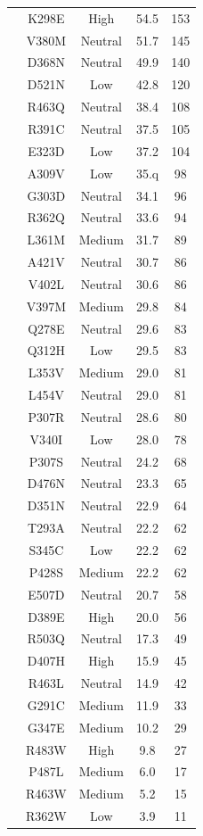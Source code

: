 \documentclass[9pt,lineno]{elife}
\begin{document}
\begin{table}[h!]
\begin{threeparttable}
\begin{tabular}{ccccc}
 &K298E & High & 54.5 & 153 \\
 &V380M & Neutral & 51.7 & 145 \\
 &D368N & Neutral & 49.9 & 140 \\
 &D521N & Low & 42.8 & 120 \\
 &R463Q & Neutral & 38.4 & 108 \\
 &R391C & Neutral & 37.5 & 105 \\
 &E323D & Low & 37.2 & 104 \\
 &A309V & Low & 35.q & 98 \\
 &G303D & Neutral & 34.1 & 96 \\
 &R362Q & Neutral & 33.6 & 94 \\
 &L361M & Medium & 31.7 & 89 \\
 &A421V & Neutral & 30.7 & 86 \\
 &V402L & Neutral & 30.6 & 86 \\
 &V397M & Medium & 29.8 & 84 \\
 &Q278E & Neutral & 29.6 & 83 \\
 &Q312H & Low & 29.5& 83 \\
 &L353V & Medium & 29.0 & 81 \\
 &L454V & Neutral & 29.0 & 81 \\
 &P307R & Neutral & 28.6 & 80 \\
 &V340I & Low & 28.0 & 78 \\
 &P307S & Neutral & 24.2 & 68 \\
 &D476N & Neutral & 23.3 & 65 \\
 &D351N & Neutral & 22.9 & 64 \\
 &T293A & Neutral &  22.2 & 62 \\
 &S345C & Low & 22.2 & 62 \\
 &P428S & Medium & 22.2 & 62 \\
 &E507D & Neutral & 20.7 & 58 \\
 &D389E & High & 20.0 & 56 \\
 &R503Q & Neutral & 17.3 & 49 \\
 &D407H & High & 15.9 & 45 \\
 &R463L & Neutral & 14.9 & 42 \\
 &G291C & Medium & 11.9 & 33 \\
 &G347E & Medium & 10.2 & 29 \\
 &R483W & High & 9.8 & 27 \\
 &P487L & Medium & 6.0 & 17 \\
 &R463W & Medium & 5.2 & 15 \\
 &R362W & Low & 3.9 & 11 \\

\end{tabular}
\end{threeparttable}
\end{table}
\end{document}
